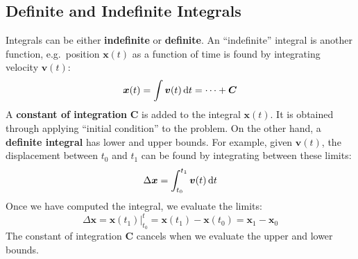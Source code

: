 \documentclass{../../oss-handout}
\begin{document}
\subsection{Definite and Indefinite Integrals}
Integrals can be either \textbf{indefinite} or \textbf{definite}. An
``indefinite'' integral is another function, e.g.\ position $\bm{x}(t)$ as a
function of time is found by integrating velocity $\bm{v}(t)$:
\begin{equation*}
  \bm{x}(t)=\int\bm{v}(t)\dl t=\cdots+\bm{C}
\end{equation*}
A \textbf{constant of integration} $\bm{C}$ is added to the integral
$\bm{x}(t)$. It is obtained through applying ``initial condition'' to the
problem. On the other hand, a \textbf{definite integral} has lower and upper
bounds. For example, given $\bm{v}(t)$, the displacement between $t_0$ and
$t_1$ can be found by integrating between these limits:
\begin{equation*}
  \Delta\bm{x}=\int_{t_0}^{t_1} \bm{v}(t)\dl t
\end{equation*}
Once we have computed the integral, we evaluate the limits:
\begin{equation*}
  \Delta\bm{x} =
  \bm{x}(t_1)\Big|^t_{t_0}=
  \bm{x}(t_1)-\bm{x}(t_0)=
  \bm{x}_1-\bm{x}_0
\end{equation*}
The constant of integration $\bm{C}$ cancels when we evaluate the upper and
lower bounds.
\end{document}
